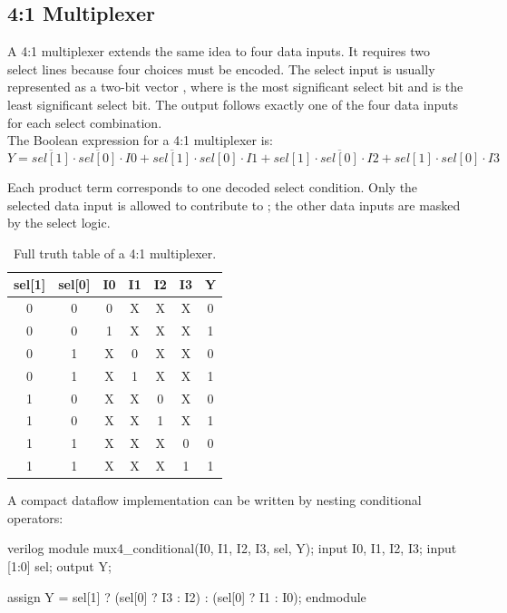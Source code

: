\subsection{4:1 Multiplexer}
A 4:1 multiplexer extends the same idea to four data inputs. It requires two select lines because
four choices must be encoded. The select input is usually represented as a two-bit vector
, where  is the most significant select bit and
 is the least significant select bit. The output follows exactly one of the four
data inputs for each select combination.\\

\noindent The Boolean expression for a 4:1 multiplexer is:
\[
Y = \overline{sel[1]}\cdot\overline{sel[0]}\cdot I0
  + \overline{sel[1]}\cdot sel[0]\cdot I1
  + sel[1]\cdot\overline{sel[0]}\cdot I2
  + sel[1]\cdot sel[0]\cdot I3
\]

\noindent Each product term corresponds to one decoded select condition. Only the selected data
input is allowed to contribute to ; the other data inputs are masked by the select
logic.

\begin{table}[H]
\centering
\renewcommand{\arraystretch}{1.2}
\begin{tabular}{|c|c|c|c|c|c|c|}
\hline
\textbf{sel[1]} & \textbf{sel[0]} & \textbf{I0} & \textbf{I1} & \textbf{I2} & \textbf{I3} & \textbf{Y} \\
\hline
0 & 0 & 0 & X & X & X & 0 \\
\hline
0 & 0 & 1 & X & X & X & 1 \\
\hline
0 & 1 & X & 0 & X & X & 0 \\
\hline
0 & 1 & X & 1 & X & X & 1 \\
\hline
1 & 0 & X & X & 0 & X & 0 \\
\hline
1 & 0 & X & X & 1 & X & 1 \\
\hline
1 & 1 & X & X & X & 0 & 0 \\
\hline
1 & 1 & X & X & X & 1 & 1 \\
\hline
\end{tabular}
\caption{Full truth table of a 4:1 multiplexer.}
\label{tab:mux4_truth}
\end{table}

\noindent A compact dataflow implementation can be written by nesting conditional operators:

\begin{codeblock}{verilog}
module mux4_conditional(I0, I1, I2, I3, sel, Y);
    input I0, I1, I2, I3;
    input [1:0] sel;
    output Y;

    assign Y = sel[1] ? (sel[0] ? I3 : I2) : (sel[0] ? I1 : I0);
endmodule
\end{codeblock}

